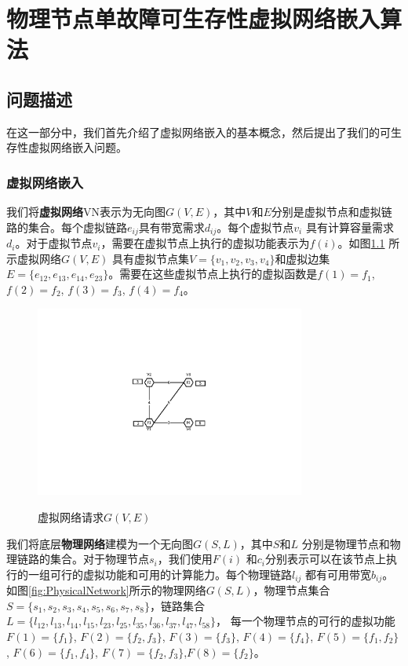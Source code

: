 \chapter{物理节点单故障可生存性虚拟网络嵌入算法}
\section{问题描述}
在这一部分中，我们首先介绍了虚拟网络嵌入的基本概念，然后提出了我们的可生存性虚拟网络嵌入问题。
\subsection{虚拟网络嵌入}
我们将\textbf{虚拟网络}VN表示为无向图$G (V,E)$，其中$V$和$E$分别是虚拟节点和虚拟链路的集合。每个虚拟链路$e_{ij}$具有带宽需求$d_{ij}$。每个虚拟节点$v_i$ 具有计算容量需求$d_i$。对于虚拟节点$v_i$，需要在虚拟节点上执行的虚拟功能表示为$f(i)$。如图\ref{fig:VirtualNetworkRequest} 所示虚拟网络$G (V,E)$ 具有虚拟节点集$V=\{v_1,v_2,v_3,v_4\}$和虚拟边集$E= \{e_{12},e_{13},e_{14},e_{23}\}$。需要在这些虚拟节点上执行的虚拟函数是$f(1)=f_1$, $f(2)=f_2$, $f(3)=f_3$, $f(4)=f_4$。

\begin{figure}[htb]
\centering
\includegraphics[width=3.5in]{figures/VirtualNetworkRequest}\\
\caption{虚拟网络请求$G(V,E)$
}\label{fig:VirtualNetworkRequest}
\end{figure}

我们将底层\textbf{物理网络}建模为一个无向图$G (S,L)$，其中$S$和$L$ 分别是物理节点和物理链路的集合。对于物理节点$s_i$，我们使用$F(i)$ 和$c_i$分别表示可以在该节点上执行的一组可行的虚拟功能和可用的计算能力。每个物理链路$l_{ij}$ 都有可用带宽$b_{ij}$。如图\ref{fig:PhysicalNetwork}所示的物理网络$G (S,L)$，物理节点集合$S=\{s_1,s_2,s_3,s_4,s_5,s_6,s_7,s_8\}$，链路集合$L=\{l_{12},l_{13},l_{14},l_{15},l_{23},l_{25},l_{35},l_{36},l_{37},l_{47},l_{58}\}$，
每一个物理节点的可行的虚拟功能$F(1)=\{f_1\}$, $F(2)=\{f_2,f_3\}$, $F(3)=\{f_3\}$, $F(4)=\{f_4\}$, $F(5)=\{f_1,f_2\}$, $F(6)=\{f_1,f_4\}$, $F(7)=\{f_2,f_3\}$,$F(8)=\{f_2\}$。

